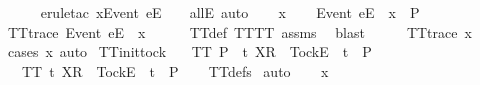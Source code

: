 \ \ \ \ \isamarkupfalse%
\ {\isacharparenleft}erule{\isacharunderscore}tac\ x{\isacharequal}{\isachardoublequoteopen}{\isacharbrackleft}Event\ e{\isacharbrackright}\isactrlsub E\ {\isacharhash}\ {\isasymrho}{\isachardoublequoteclose}\ \ allE{\isacharcomma}\ auto{\isacharparenright}\isanewline
{}\isamarkupfalse%
\isanewline
\ \ \isamarkupfalse%
\ x\isanewline
\ \ \isamarkupfalse%
\ {\isachardoublequoteopen}{\isacharbrackleft}Event\ e{\isacharbrackright}\isactrlsub E\ {\isacharhash}\ x\ {\isasymin}\ P{\isachardoublequoteclose}\isanewline
\ \ \isamarkupfalse%
\ \isamarkupfalse%
\ {\isachardoublequoteopen}TT{}{\isacharunderscore}trace\ {\isacharparenleft}{\isacharbrackleft}Event\ e{\isacharbrackright}\isactrlsub E\ {\isacharhash}\ x{\isacharparenright}{\isachardoublequoteclose}\isanewline
\ \ \ \ \isamarkupfalse%
\ TT{}{\isacharunderscore}def\ TT{\isacharunderscore}TT{}\ assms{\isacharparenleft}{}{\isacharparenright}\ \isamarkupfalse%
\ blast\isanewline
\ \ \isamarkupfalse%
\ \isamarkupfalse%
\ {\isachardoublequoteopen}TT{}{\isacharunderscore}trace\ x{\isachardoublequoteclose}\isanewline
\ \ \ \ \isamarkupfalse%
\ {\isacharparenleft}cases\ x{\isacharcomma}\ auto{\isacharparenright}\isanewline
{}\isamarkupfalse%
%
\endisatagproof
{\isafoldproof}%
%
\isadelimproof
\isanewline
%
\endisadelimproof
\isanewline
{}\isamarkupfalse%
\ TT{\isacharunderscore}init{\isacharunderscore}tock{\isacharcolon}\isanewline
\ \ \ {\isachardoublequoteopen}TT\ P{\isachardoublequoteclose}\ {\isachardoublequoteopen}{\isasymexists}\ t{\isachardot}\ {\isacharbrackleft}X{\isacharbrackright}\isactrlsub R\ {\isacharhash}\ {\isacharbrackleft}Tock{\isacharbrackright}\isactrlsub E\ {\isacharhash}\ t\ {\isasymin}\ P{\isachardoublequoteclose}\isanewline
\ \ \ {\isachardoublequoteopen}TT\ {\isacharbraceleft}t{\isachardot}\ {\isacharbrackleft}X{\isacharbrackright}\isactrlsub R\ {\isacharhash}\ {\isacharbrackleft}Tock{\isacharbrackright}\isactrlsub E\ {\isacharhash}\ t\ {\isasymin}\ P{\isacharbraceright}{\isachardoublequoteclose}\isanewline
%
\isadelimproof
\ \ %
\endisadelimproof
%
\isatagproof
{}\isamarkupfalse%
\ TT{\isacharunderscore}defs\isanewline
{}\isamarkupfalse%
\ auto\isanewline
\ \ \isamarkupfalse%
\ x\isanewline
\ \ \isamarkupfalse%
